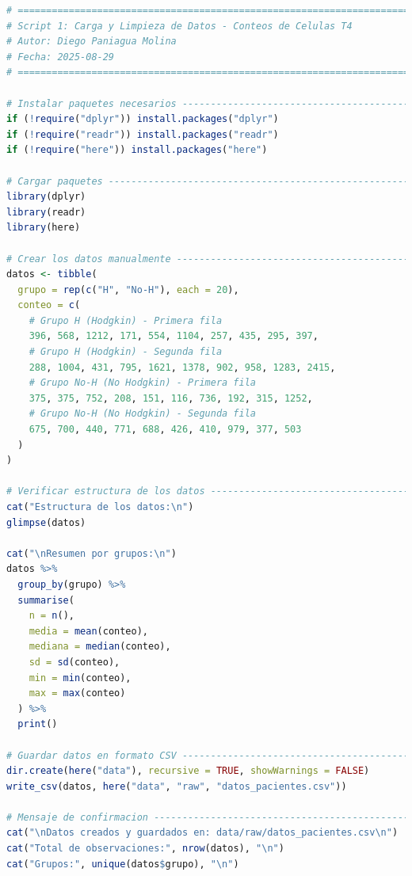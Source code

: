 \begin{lstlisting}[language=R, caption={Script 1: Carga y Limpieza de Datos - Conteos de Células T4.}, label={lst:script1}]
# =============================================================================
# Script 1: Carga y Limpieza de Datos - Conteos de Celulas T4
# Autor: Diego Paniagua Molina
# Fecha: 2025-08-29
# =============================================================================

# Instalar paquetes necesarios ------------------------------------------------
if (!require("dplyr")) install.packages("dplyr")
if (!require("readr")) install.packages("readr")
if (!require("here")) install.packages("here")

# Cargar paquetes -------------------------------------------------------------
library(dplyr)
library(readr)
library(here)

# Crear los datos manualmente -------------------------------------------------
datos <- tibble(
  grupo = rep(c("H", "No-H"), each = 20),
  conteo = c(
    # Grupo H (Hodgkin) - Primera fila
    396, 568, 1212, 171, 554, 1104, 257, 435, 295, 397,
    # Grupo H (Hodgkin) - Segunda fila  
    288, 1004, 431, 795, 1621, 1378, 902, 958, 1283, 2415,
    # Grupo No-H (No Hodgkin) - Primera fila
    375, 375, 752, 208, 151, 116, 736, 192, 315, 1252,
    # Grupo No-H (No Hodgkin) - Segunda fila
    675, 700, 440, 771, 688, 426, 410, 979, 377, 503
  )
)

# Verificar estructura de los datos -------------------------------------------
cat("Estructura de los datos:\n")
glimpse(datos)

cat("\nResumen por grupos:\n")
datos %>%
  group_by(grupo) %>%
  summarise(
    n = n(),
    media = mean(conteo),
    mediana = median(conteo),
    sd = sd(conteo),
    min = min(conteo),
    max = max(conteo)
  ) %>%
  print()

# Guardar datos en formato CSV ------------------------------------------------
dir.create(here("data"), recursive = TRUE, showWarnings = FALSE)
write_csv(datos, here("data", "raw", "datos_pacientes.csv"))

# Mensaje de confirmacion -----------------------------------------------------
cat("\nDatos creados y guardados en: data/raw/datos_pacientes.csv\n")
cat("Total de observaciones:", nrow(datos), "\n")
cat("Grupos:", unique(datos$grupo), "\n")
\end{lstlisting}

\clearpage %


